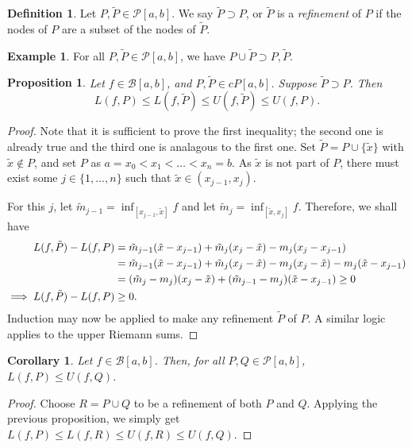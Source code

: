 \documentclass[15pt,a4paper]{book}
\newtheorem{proposition}[theorem]{Proposition}
\newtheorem{corollary}[theorem]{Corollary}
\theoremstyle{definition}
\newtheorem{definition}[theorem]{Definition}
\newtheorem{example}[theorem]{Example}
\newcommand{\eax}[1]{\emph{#1}\index{#1}} %
\newcommand{\cP}{\mathcal{P}}
\newcommand{\cB}{\mathcal{B}}
\begin{document}
\begin{definition}
    Let $P, \tilde{P} \in \cP [a,b]$. We say $\tilde{P} \supset P$, or $\tilde{P}$ is a \eax{refinement} of $P$ if the nodes of $P$ are a subset of the nodes of $\tilde{P}$.
\end{definition}
\begin{example}
    For all $P,\tilde{P} \in \cP [a,b]$, we have $P \cup \tilde{P} \supset P, \tilde{P}$.
\end{example}
\begin{proposition}
    Let $f \in \cB [a,b]$, and $P, \tilde{P} \in cP [a,b]$. Suppose $\tilde{P} \supset P$. Then
    \begin{equation}
        L(f,P) \leq L(f,\tilde{P}) \leq U(f,\tilde{P}) \leq U(f,P).
    \end{equation}
\end{proposition}
\begin{proof}
    Note that it is sufficient to prove the first inequality; the second one is already true and the third one is analagous to the first one. Set $\tilde{P} = P \cup \{\tilde{x}\}$ with $\tilde{x} \notin P$, and set $P$ as $a = x_{0} < x_{1} < \ldots < x_{n} = b$. As $\tilde{x}$ is not part of $P$, there must exist some $j \in \{1, \ldots, n\}$ such that $\tilde{x} \in (x_{j-1},x_{j})$.

    For this $j$, let $\tilde{m}_{j-1} = \inf_{[x_{j-1},\tilde{x}]} f$ and let $\tilde{m}_{j} = \inf_{[\tilde{x},x_{j}]} f$. Therefore, we shall have
    \begin{align}
        L(f,\tilde{P}) - L(f,P) &= \tilde{m}_{j-1}(\tilde{x}-x_{j-1}) + \tilde{m}_{j}(x_{j}-\tilde{x}) - m_{j}(x_{j}-x_{j-1}) \notag \\
        &= \tilde{m}_{j-1}(\tilde{x}-x_{j-1}) + \tilde{m}_{j}(x_{j}-\tilde{x}) - m_{j}(x_{j}-\tilde{x}) - m_{j}(\tilde{x}-x_{j-1}) \notag \\
        &= (\tilde{m}_{j}-m_{j})(x_{j}-\tilde{x}) + (\tilde{m}_{j-1} - m_{j})(\tilde{x}-x_{j-1}) \geq 0 \notag \\
        \implies L(f,\tilde{P}) - L(f,P) &\geq 0.
    \end{align}
    Induction may now be applied to make any refinement $\tilde{P}$ of $P$. A similar logic applies to the upper Riemann sums.
\end{proof}
\begin{corollary}
    Let $f \in \cB [a,b]$. Then, for all $P,Q \in \cP [a,b]$, $L(f,P) \leq U(f,Q)$.
\end{corollary}
\begin{proof}
    Choose $R = P \cup Q$ to be a refinement of both $P$ and $Q$. Applying the previous proposition, we simply get $L(f,P) \leq L(f,R) \leq U(f,R) \leq U(f,Q)$.
\end{proof}
\end{document}
